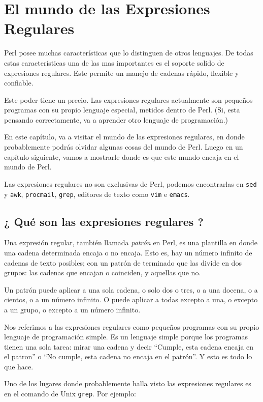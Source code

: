 \chapter{El mundo de las Expresiones Regulares}

Perl posee muchas características que lo distinguen de otros lenguajes. De todas estas características una de las mas importantes es el soporte solido de expresiones regulares. Este permite un manejo de cadenas rápido, f\mbox{}lexible y conf\mbox{}iable.

Este poder tiene un precio. Las expresiones regulares actualmente son pequeños programas con su propio lenguaje especial, metidos dentro de Perl. (Si, esta pensando correctamente, va a aprender otro lenguaje de programación.)

En este capítulo, va a visitar el mundo de las expresiones regulares, en donde probablemente podrás olvidar algunas cosas del mundo de Perl. Luego en un capítulo siguiente, vamos a mostrarle donde es que este mundo encaja en el mundo de Perl.

Las expresiones regulares no son exclusivas de Perl, podemos encontrarlas en \texttt{sed} y \texttt{awk}, \texttt{procmail}, \texttt{grep}, editores de texto como \texttt{vim} e \texttt{emacs}.

\section{¿ Qué son las expresiones regulares ?}

Una expresión regular, también llamada \emph{patrón} en Perl, es una plantilla en donde una cadena determinada encaja o no encaja. Esto es, hay un número inf\mbox{}inito de cadenas de texto posibles; con un patrón de terminado que las divide en dos grupos: las cadenas que encajan o coinciden, y aquellas que no.

Un patrón puede aplicar a una sola cadena, o solo dos o tres, o a una docena, o a cientos, o a un número inf\mbox{}inito. O puede aplicar a todas excepto a una, o excepto a un grupo, o excepto a un número inf\mbox{}inito.

Nos referimos a las expresiones regulares como pequeños programas con su propio lenguaje de programación simple. Es un lenguaje simple porque los programas tienen una sola tarea: mirar una cadena y decir ``Cumple, esta cadena encaja en el patron'' o ``No cumple, esta cadena no encaja en el patrón''. Y esto es todo lo que hace.

Uno de los lugares donde probablemente halla visto las expresiones regulares es en el comando de Unix \texttt{grep}. Por ejemplo:

